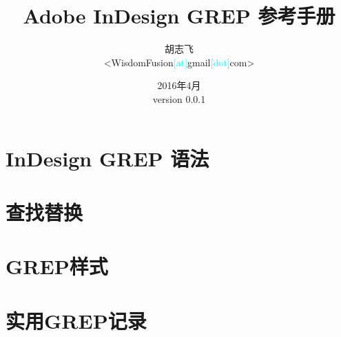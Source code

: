 \documentclass[12pt,a4paper]{ctexart}
\begin{document}
\title{\textbf{Adobe InDesign GREP 参考手册}}
\author{胡志飞\\<WisdomFusion\textcolor{cyan}{\small [at]}gmail\textcolor{cyan}{\small [dot]}com>}
\date{\color{OrangeRed}2016年4月\\version 0.0.1}

\maketitle{}
\thispagestyle{empty}
\clearpage{}

\tableofcontents

\clearpage{}

\setcounter{page}{1}

\section{InDesign GREP 语法}
\label{sec:indesign-grep-syntax}


\section{查找替换}
\label{sec:search-replace}


\section{GREP样式}
\label{sec:grep-style}


\section{实用GREP记录}
\label{sec:grep-examples}
\end{document}

